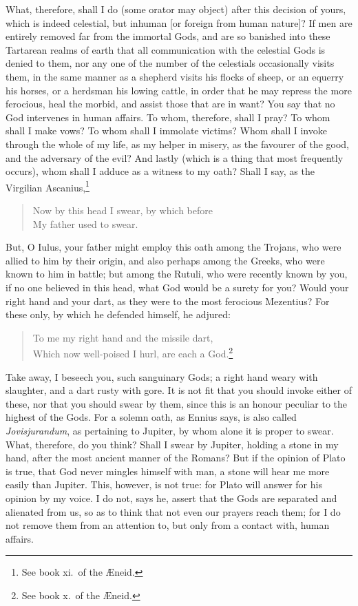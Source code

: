 \documentclass{article}
\begin{document}
What, therefore, shall I do (some orator may object) after this decision of
yours, which is indeed celestial, but inhuman [or foreign from human nature]?
If men are entirely removed far from the immortal Gods, and are so banished
into these Tartarean realms of earth that all communication with the celestial
Gods is denied to them, nor any one of the number of the celestials
occasionally visits them, in the same manner as a shepherd visits his flocks of
sheep, or an equerry his horses, or a herdsman his lowing cattle, in order that
he may repress the more ferocious, heal the morbid, and assist those that are
in want? You say that no God intervenes in human affairs. To whom, therefore,
shall I pray? To whom shall I make vows? To whom shall I immolate victims? Whom
shall I invoke through the whole of my life, as my helper in misery, as the
favourer of the good, and the adversary of the evil? And lastly (which is a
thing that most frequently occurs), whom shall I adduce as a witness to my
oath? Shall I say, as the Virgilian Ascanius,\footnote{See book xi.~of the
{\AE}neid.}

\begin{verse}
Now by this head I swear, by which before\\
My father used to swear.
\end{verse}

\noindent But, O Iulus, your father might employ this oath among the Trojans,
who were allied to him by their origin, and also perhaps among the Greeks, who
were known to him in battle; but among the Rutuli, who were recently known by
you, if no one believed in this head, what God would be a surety for you? Would
your right hand and your dart, as they were to the most ferocious Mezentius?
For these only, by which he defended himself, he adjured:

\begin{verse}
To me my right hand and the missile dart,\\
Which now well-poised I hurl, are each a God.\footnote{See book x.~of the
{\AE}neid.}
\end{verse}

\noindent Take away, I beseech you, such sanguinary Gods; a right hand weary
with slaughter, and a dart rusty with gore. It is not fit that you should
invoke either of these, nor that you should swear by them, since this is an
honour peculiar to the highest of the Gods. For a solemn oath, as Ennius says,
is also called \textit{Jovisjurandum}, as pertaining to Jupiter, by whom alone
it is proper to swear. What, therefore, do you think? Shall I swear by Jupiter,
holding a stone in my hand, after the most ancient manner of the Romans? But if
the opinion of Plato is true, that God never mingles himself with man, a stone
will hear me more easily than Jupiter. This, however, is not true: for Plato
will answer for his opinion by my voice. I do not, says he, assert that the
Gods are separated and alienated from us, so as to think that not even our
prayers reach them; for I do not remove them from an attention to, but only
from a contact with, human affairs.
\end{document}

